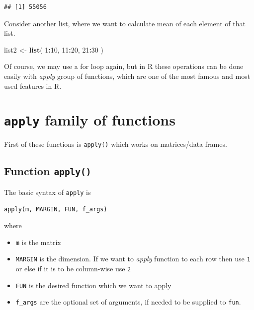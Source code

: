 \documentclass[
]{book}
\newenvironment{Shaded}{\begin{snugshade}}{\end{snugshade}}
\newcommand{\DecValTok}[1]{\textcolor[rgb]{0.00,0.00,0.81}{#1}}
\newcommand{\FunctionTok}[1]{\textcolor[rgb]{0.13,0.29,0.53}{\textbf{#1}}}
\newcommand{\NormalTok}[1]{#1}
\newcommand{\OtherTok}[1]{\textcolor[rgb]{0.56,0.35,0.01}{#1}}
\newcommand{\SpecialCharTok}[1]{\textcolor[rgb]{0.81,0.36,0.00}{\textbf{#1}}}
\providecommand{\tightlist}{%
  \setlength{\itemsep}{0pt}\setlength{\parskip}{0pt}}
\begin{document}
\begin{verbatim}
## [1] 55056
\end{verbatim}

Consider another list, where we want to calculate mean of each element of that list.

\begin{Shaded}
\begin{Highlighting}[]
\NormalTok{list2 }\OtherTok{\textless{}{-}} \FunctionTok{list}\NormalTok{(}
  \DecValTok{1}\SpecialCharTok{:}\DecValTok{10}\NormalTok{,}
  \DecValTok{11}\SpecialCharTok{:}\DecValTok{20}\NormalTok{,}
  \DecValTok{21}\SpecialCharTok{:}\DecValTok{30}
\NormalTok{)}
\end{Highlighting}
\end{Shaded}

Of course, we may use a for loop again, but in R these operations can be done easily with \emph{apply} group of functions, which are one of the most famous and most used features in R.

\hypertarget{apply-family-of-functions}{%
\section{\texorpdfstring{\texttt{apply} family of functions}{apply family of functions}}\label{apply-family-of-functions}}

First of these functions is \texttt{apply()} which works on matrices/data frames.

\hypertarget{function-apply}{%
\subsection{\texorpdfstring{Function \texttt{apply()}}{Function apply()}}\label{function-apply}}

The basic syntax of \texttt{apply} is

\begin{verbatim}
apply(m, MARGIN, FUN, f_args)
\end{verbatim}

where

\begin{itemize}
\tightlist
\item
  \texttt{m} is the matrix
\item
  \texttt{MARGIN} is the dimension. If we want to \emph{apply} function to each row then use \texttt{1} or else if it is to be column-wise use \texttt{2}
\item
  \texttt{FUN} is the desired function which we want to apply
\item
  \texttt{f\_args} are the optional set of arguments, if needed to be supplied to \texttt{fun}.
\end{itemize}
\end{document}
